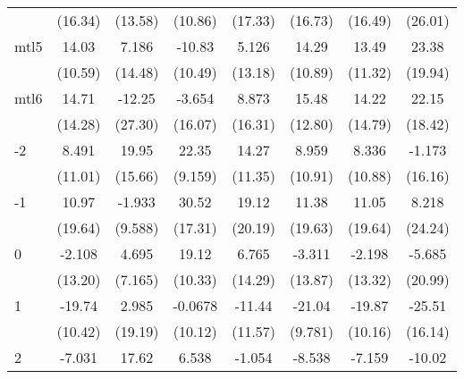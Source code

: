 \documentclass{article}
\begin{document}
{\begin{longtable}{l*{7}{c}}
                &  (16.34)         &  (13.58)         &  (10.86)         &  (17.33)         &  (16.73)         &  (16.49)         &  (26.01)         \\
mtl5            &    14.03         &    7.186         &   -10.83         &    5.126         &    14.29         &    13.49         &    23.38         \\
                &  (10.59)         &  (14.48)         &  (10.49)         &  (13.18)         &  (10.89)         &  (11.32)         &  (19.94)         \\
mtl6            &    14.71         &   -12.25         &   -3.654         &    8.873         &    15.48         &    14.22         &    22.15         \\
                &  (14.28)         &  (27.30)         &  (16.07)         &  (16.31)         &  (12.80)         &  (14.79)         &  (18.42)         \\
-2              &    8.491         &    19.95         &    22.35\sym{*}  &    14.27         &    8.959         &    8.336         &   -1.173         \\
                &  (11.01)         &  (15.66)         &  (9.159)         &  (11.35)         &  (10.91)         &  (10.88)         &  (16.16)         \\
-1              &    10.97         &   -1.933         &    30.52         &    19.12         &    11.38         &    11.05         &    8.218         \\
                &  (19.64)         &  (9.588)         &  (17.31)         &  (20.19)         &  (19.63)         &  (19.64)         &  (24.24)         \\
0               &   -2.108         &    4.695         &    19.12         &    6.765         &   -3.311         &   -2.198         &   -5.685         \\
                &  (13.20)         &  (7.165)         &  (10.33)         &  (14.29)         &  (13.87)         &  (13.32)         &  (20.99)         \\
1               &   -19.74         &    2.985         &  -0.0678         &   -11.44         &   -21.04\sym{*}  &   -19.87         &   -25.51         \\
                &  (10.42)         &  (19.19)         &  (10.12)         &  (11.57)         &  (9.781)         &  (10.16)         &  (16.14)         \\
2               &   -7.031         &    17.62         &    6.538         &   -1.054         &   -8.538         &   -7.159         &   -10.02         \\

\end{longtable}}
\end{document}

